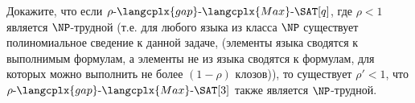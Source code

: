 Докажите, что если $\rho\text{-}\langcplx{gap}\text{-}\langcplx{Max}\text{-}\SAT[q]$, где $\rho < 1$
является $\NP$-трудной (т.е. для любого языка из класса $\NP$ существует полиномиальное сведение к данной
задаче, (элементы языка сводятся к выполнимым формулам, а элементы не из языка сводятся к формулам, для
которых можно выполнить не более $(1 - \rho)$ клозов)), то существует $\rho' < 1$, что
$\rho\text{-}\langcplx{gap}\text{-}\langcplx{Max}\text{-}\SAT[3]$ также является $\NP$-трудной.
